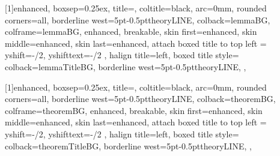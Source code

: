 
%
%


[1]{enhanced,
    boxsep=0.25ex,
    title=\textbf{},
    coltitle=black,
    arc=0mm,
    rounded corners=all,
    borderline west={5pt}{-0.5pt}{theoryLINE},
    colback=lemmaBG,
    colframe=lemmaBG,
    enhanced,
    breakable,
    skin first=enhanced,
    skin middle=enhanced,
    skin last=enhanced,
    attach boxed title to top left ={
        yshift=-\tcboxedtitleheight/2,
        yshifttext=-\tcboxedtitleheight/2
    },
    halign title=left,
    boxed title style={
        colback=lemmaTitleBG,
        borderline west={5pt}{-0.5pt}{theoryLINE},
    },
}  %

[1]{enhanced,
    boxsep=0.25ex,
    title=,
    coltitle=black,
    arc=0mm,
    rounded corners=all,
    borderline west={5pt}{-0.5pt}{theoryLINE},
    colback=theoremBG,
    colframe=theoremBG,
    enhanced,
    breakable,
    skin first=enhanced,
    skin middle=enhanced,
    skin last=enhanced,
    attach boxed title to top left ={
        yshift=-\tcboxedtitleheight/2,
        yshifttext=-\tcboxedtitleheight/2
    },
    halign title=left,
    boxed title style={%
        colback=theoremTitleBG,
        borderline west={5pt}{-0.5pt}{theoryLINE},
    },
}  %


